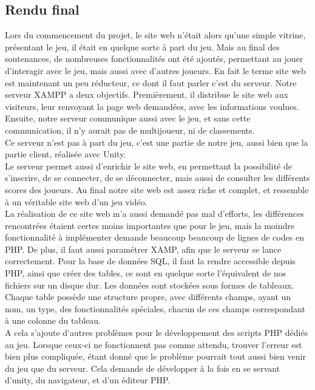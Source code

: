 \documentclass[12pt]{article}
\begin{document}
\subsection{Rendu final}

Lors du commencement du projet, le site web n'était alors qu'une simple vitrine, présentant le jeu, il était en quelque sorte à part du jeu. Mais au final des soutenances, de nombreuses fonctionnalités ont été ajoutés, permettant au jouer d'interagir avec le jeu, mais aussi avec d'autres joueurs. En fait le terme site web est maintenant un peu réducteur, ce dont il faut parler c'est du serveur. Notre serveur XAMPP a deux objectifs. Premièrement, il distribue le site web aux visiteurs, leur renvoyant la page web demandées, avec les informations voulues.\\
Ensuite, notre serveur communique aussi avec le jeu, et sans cette communication, il n'y aurait pas de multijoueur, ni de classements.\\
Ce serveur n'est pas à part du jeu, c'est une partie de notre jeu, aussi bien que la partie client, réalisée avec Unity.\\

Le serveur permet aussi d'enrichir le site web, en permettant la possibilité de s'inscrire, de se connecter, de se déconnecter, mais aussi de consulter les différents scores des joueurs. Au final notre site web est assez riche et complet, et ressemble à un véritable site web d'un jeu vidéo.\\

La réalisation de ce site web m'a aussi demandé pas mal d'efforts, les différences rencontrées étaient certes moins importantes que pour le jeu, mais la moindre fonctionnalité à implémenter demande beaucoup beaucoup de lignes de codes en PHP. De plus, il faut aussi paramétrer XAMP, afin que le serveur se lance correctement. Pour la base de données SQL, il faut la rendre accessible depuis PHP, ainsi que créer des tables, ce sont en quelque sorte l'équivalent de nos fichiers sur un disque dur. Les données sont stockées sous formes de tableaux. Chaque table possède une structure propre, avec différents champs, ayant un nom, un type, des fonctionnalités spéciales, chacun de ces champs correspondant à une colonne du tableau.\\
A cela s'ajoute d'autres problèmes pour le développement des scripts PHP dédiés au jeu. Lorsque ceux-ci ne fonctionnent pas comme attendu, trouver l'erreur est bien plus compliquée, étant donné que le problème pourrait tout aussi bien venir du jeu que du serveur. Cela demande de développer à la fois en se servant d'unity, du navigateur, et d'un éditeur PHP.
\end{document}
